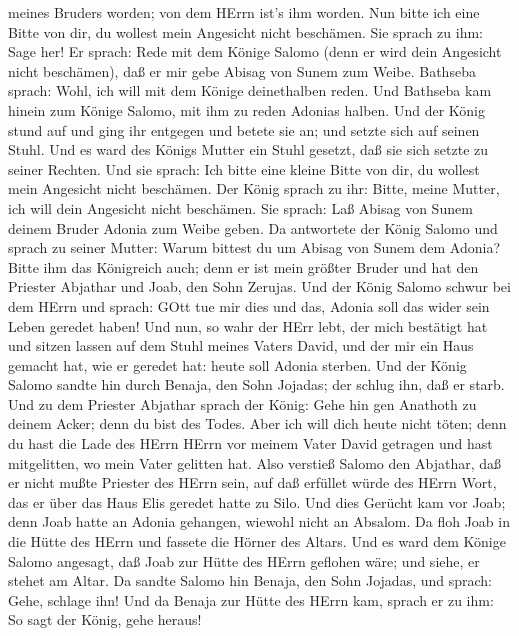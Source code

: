 meines Bruders worden; von dem HErrn ist's ihm worden.  Nun
bitte ich eine Bitte von dir, du wollest mein Angesicht nicht beschämen.
Sie sprach zu ihm: Sage her!  Er sprach: Rede mit dem
Könige Salomo (denn er wird dein Angesicht nicht beschämen), daß er mir
gebe Abisag von Sunem zum Weibe.  Bathseba sprach: Wohl,
ich will mit dem Könige deinethalben reden.  Und Bathseba
kam hinein zum Könige Salomo, mit ihm zu reden Adonias halben. Und der
König stund auf und ging ihr entgegen und betete sie an; und setzte sich
auf seinen Stuhl. Und es ward des Königs Mutter ein Stuhl gesetzt, daß
sie sich setzte zu seiner Rechten.  Und sie sprach: Ich
bitte eine kleine Bitte von dir, du wollest mein Angesicht nicht
beschämen. Der König sprach zu ihr: Bitte, meine Mutter, ich will dein
Angesicht nicht beschämen.  Sie sprach: Laß Abisag von
Sunem deinem Bruder Adonia zum Weibe geben.  Da antwortete
der König Salomo und sprach zu seiner Mutter: Warum bittest du um Abisag
von Sunem dem Adonia? Bitte ihm das Königreich auch; denn er ist mein
größter Bruder und hat den Priester Abjathar und Joab, den Sohn Zerujas.
 Und der König Salomo schwur bei dem HErrn und sprach: GOtt
tue mir dies und das, Adonia soll das wider sein Leben geredet haben!
 Und nun, so wahr der HErr lebt, der mich bestätigt hat und
sitzen lassen auf dem Stuhl meines Vaters David, und der mir ein Haus
gemacht hat, wie er geredet hat: heute soll Adonia sterben.
 Und der König Salomo sandte hin durch Benaja, den Sohn
Jojadas; der schlug ihn, daß er starb.  Und zu dem Priester
Abjathar sprach der König: Gehe hin gen Anathoth zu deinem Acker; denn
du bist des Todes. Aber ich will dich heute nicht töten; denn du hast
die Lade des HErrn HErrn vor meinem Vater David getragen und hast
mitgelitten, wo mein Vater gelitten hat.  Also verstieß
Salomo den Abjathar, daß er nicht mußte Priester des HErrn sein, auf daß
erfüllet würde des HErrn Wort, das er über das Haus Elis geredet hatte
zu Silo.  Und dies Gerücht kam vor Joab; denn Joab hatte an
Adonia gehangen, wiewohl nicht an Absalom. Da floh Joab in die Hütte des
HErrn und fassete die Hörner des Altars.  Und es ward dem
Könige Salomo angesagt, daß Joab zur Hütte des HErrn geflohen wäre; und
siehe, er stehet am Altar. Da sandte Salomo hin Benaja, den Sohn
Jojadas, und sprach: Gehe, schlage ihn!  Und da Benaja zur
Hütte des HErrn kam, sprach er zu ihm: So sagt der König, gehe heraus!
